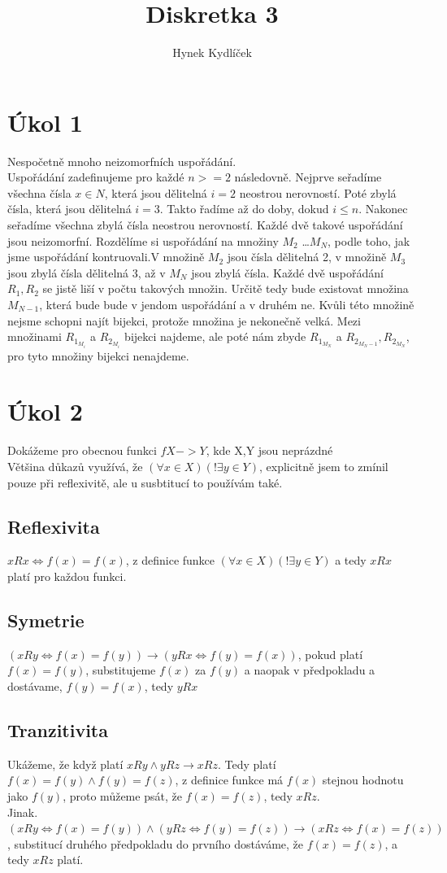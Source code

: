 \documentclass{article}
\title{Diskretka 3}
\author{Hynek Kydlíček}
\begin{document}
\section{Úkol 1}
Nespočetně mnoho neizomorfních uspořádání.\\
Uspořádání zadefinujeme pro každé $n >= 2$ následovně.
Nejprve seřadíme všechna čísla $x \in N$, která jsou dělitelná $i=2$ neostrou nerovností.
Poté zbylá čísla, která jsou dělitelná $i=3$. Takto řadíme až do doby, dokud $i \le n$.
Nakonec seřadíme všechna zbylá čísla neostrou nerovností.
Každé dvě takové uspořádání jsou neizomorfní.
Rozdělíme si uspořádání na množiny $M_2$ \dots $M_N$, podle toho, jak jsme uspořádání kontruovali.V množině $M_2$ jsou čísla dělitelná 2, v množině $M_3$ jsou zbylá čísla dělitelná 3, až v $M_N$ jsou zbylá čísla. Každé dvě uspořádání $R_1, R_2$ se jistě liší v počtu takových množin.
Určitě tedy bude existovat množina $M_{N-1}$, která bude bude v jendom uspořádání a v druhém ne.
Kvůli této množině nejsme schopni najít bijekci, protože množina je nekonečně velká.
Mezi množinami $R_1_{M_i}$ a $R_2_{M_i}$ bijekci najdeme, ale poté nám zbyde $R_1_{M_N}$ a $R_2_{M_N-1}, R_2_{M_N}$, pro tyto množiny bijekci nenajdeme.

\section{Úkol 2}
Dokážeme pro obecnou funkci $f X -> Y$, kde X,Y jsou neprázdné\\
Většina důkazů využívá, že $(\forall x \in X) (!\exists y \in Y)$, explicitně jsem to zmínil pouze při reflexivitě, ale u susbtitucí to používám také.
\subsection{Reflexivita}
$xRx \iff f(x) = f(x)$, z definice funkce $(\forall x \in X)(!\exists y \in Y)$
a tedy $xRx$ platí pro každou funkci.
\subsection{Symetrie}
$(xRy \iff f(x) = f(y)) \rightarrow (yRx \iff f(y) = f(x))$,
pokud platí $f(x) = f(y)$, substitujeme $f(x)$ za $f(y)$ a naopak v předpokladu a dostávame, $f(y) = f(x)$, tedy $yRx$
\subsection{Tranzitivita}
Ukážeme, že když platí $xRy \wedge yRz \rightarrow xRz$.
Tedy platí $f(x) = f(y) \wedge f(y) = f(z)$, z definice funkce má $f(x)$ stejnou hodnotu jako $f(y)$, proto můžeme psát, že
$f(x) = f(z)$, tedy $xRz$.
\\
Jinak.
$(xRy \iff f(x) = f(y)) \wedge (yRz \iff f(y) = f(z)) \rightarrow (xRz \iff f(x) = f(z))$, substitucí druhého předpokladu do prvního dostáváme, že $f(x) = f(z)$, a tedy $xRz$ platí.
\pagebreak
\end{document}
